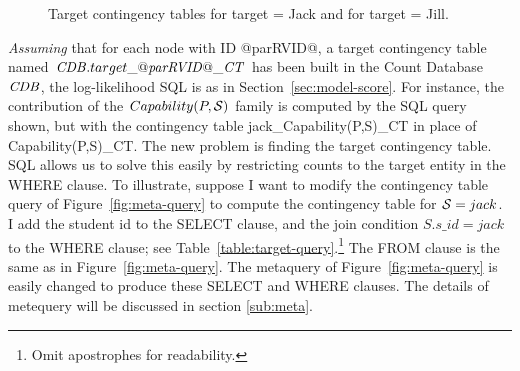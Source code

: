 \documentclass{sfuthesis}
\begin{document}
\begin{figure}[!h] 
 \centering
{} 
\caption{Target contingency tables for target = Jack and for target = Jill.}
 \label{fig:targetct}
\end{figure}

{\em Assuming} that for each node with ID @parRVID@, a target contingency table named $\CDB.target\_@\it{parRVID}@\_\cttable$ has been built in the Count Database $\CDB$, the log-likelihood SQL is as in Section~\ref{sec:model-score}. For instance, the contribution of the $Capability(\P,\S)$ family is computed by the SQL query shown,  but with the contingency table jack\_Capability(P,S)\_CT in place of Capability(P,S)\_CT.
The new problem is finding the target contingency table. SQL allows us to solve this easily by restricting counts to the target entity in the WHERE clause. To illustrate, suppose I  want to modify the contingency table query of Figure~\ref{fig:meta-query} to compute the contingency table for $\S = jack$. I  add the student id to the SELECT clause, and the join condition $S.s\_id = jack$ to the WHERE clause; see Table~\ref{table:target-query}.\footnote{Omit apostrophes for readability.} 
The FROM clause is the same as in Figure~\ref{fig:meta-query}. The metaquery of Figure~\ref{fig:meta-query} is easily changed to produce these SELECT and WHERE clauses. The details of metequery will be discussed in section \ref{sub:meta}.
\end{document}
